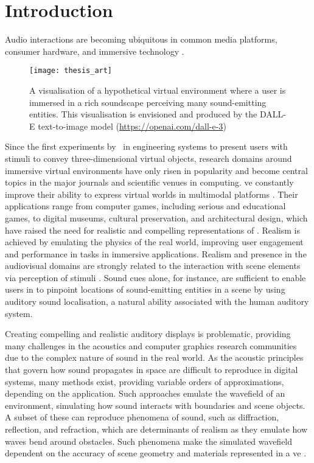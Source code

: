 \chapter{Introduction}\label{ch:introduction}

Audio interactions are becoming ubiquitous in common media platforms, consumer hardware, and immersive technology \cite{yang2019audio}.

\begin{figure}[tbp]
    \centering
    \texttt{[image: thesis\_art]}
    \caption[A visualisation of a hypothetical virtual environment where a user is immersed in a rich soundscape perceiving many sound-emitting entities.]{A visualisation of a hypothetical virtual environment where a user is immersed in a rich soundscape perceiving many sound-emitting entities. This visualisation is envisioned and produced by the DALL-E text-to-image model (\url{https://openai.com/dall-e-3})}
\end{figure}

Since the first experiments by~\cite{sutherland1968head} in engineering systems to present users with stimuli to convey three-dimensional virtual objects, research domains around immersive virtual environments have only risen in popularity and become central topics in the major journals and scientific venues in computing.
\acrfull{ve} constantly improve their ability to express virtual worlds in multimodal platforms \citep{rubio2017immersive}. Their applications range from computer games, including serious and educational games, to digital museums, cultural preservation, and architectural design, which have raised the need for realistic and compelling representations of . Realism is achieved by emulating the physics of the real world, improving user engagement and performance in tasks in immersive applications. Realism and presence in the audiovisual domains are strongly related to the interaction with scene elements via perception of stimuli \citep{zimmons2003influence, lokki2005navigation}. Sound cues alone, for instance, are sufficient to enable users in  to pinpoint locations of sound-emitting entities in a scene by using auditory sound localisation, a natural ability associated with the human auditory system.\par
Creating compelling and realistic auditory displays is problematic, providing many challenges in the acoustics and computer graphics research communities due to the complex nature of sound in the real world. As the acoustic principles that govern how sound propagates in space are difficult to reproduce in digital systems, many methods exist, providing variable orders of approximations, depending on the application. Such approaches emulate the wavefield of an environment, simulating how sound interacts with boundaries and scene objects. A subset of these can reproduce phenomena of sound, such as diffraction, reflection, and refraction, which are determinants of realism as they emulate how waves bend around obstacles. Such phenomena make the simulated wavefield dependent on the accuracy of scene geometry and materials represented in a \acrshort{ve} \citep{kuttruff2016room}.\par

